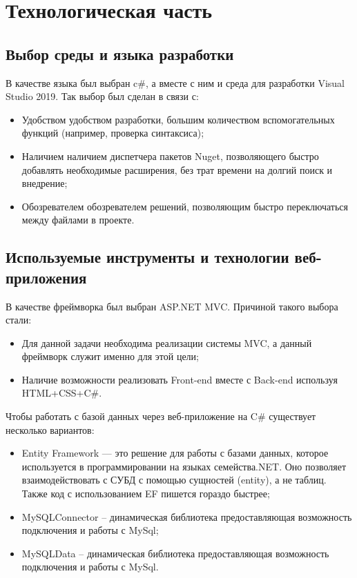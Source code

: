 \chapter{Технологическая часть}

\section{Выбор среды и языка разработки}

\hspace{0cm} В качестве языка был выбран c\#, а вместе с ним и среда для разработки Visual Studio 2019. Так выбор был сделан в связи с:

\begin{itemize}
  \item Удобством удобством разработки, большим количеством вспомогательных функций (например, проверка синтаксиса);
  \item Наличием наличием диспетчера пакетов Nuget, позволяющего быстро добавлять необходимые расширения, без трат времени на долгий поиск и внедрение;
  \item Обозревателем обозревателем решений, позволяющим быстро переключаться между файлами в проекте.
\end{itemize}


\section{Используемые инструменты и технологии веб-приложения}

\hspace{0cm} В качестве фреймворка был выбран ASP.NET MVC. Причиной такого выбора стали:

\begin{itemize}
  \item Для данной задачи необходима реализации системы MVC, а данный фреймворк служит именно для этой цели;
  \item Наличие возможности реализовать Front-end вместе с Back-end используя HTML+CSS+C\#.
\end{itemize}

\hspace{0cm} Чтобы работать с базой данных через веб-приложение на C\# существует несколько вариантов:

\begin{itemize}
  \item Entity Framework — это решение для работы с базами данных, которое используется в программировании на языках семейства.NET. Оно позволяет взаимодействовать с СУБД с помощью сущностей (entity), а не таблиц. Также код с использованием EF пишется гораздо быстрее;
  \item MySQLConnector – динамическая библиотека предоставляющая возможность подключения и работы с MySql;
  \item MySQLData – динамическая библиотека предоставляющая возможность подключения и работы с MySql.
\end{itemize}

